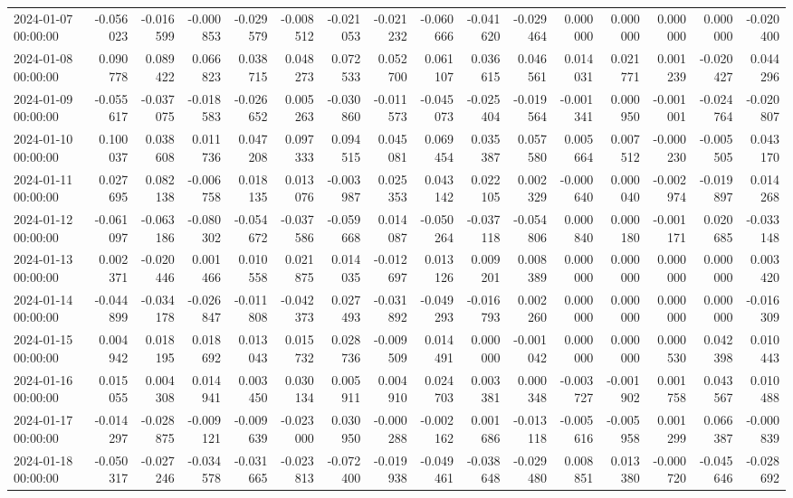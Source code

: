 \begin{tabular}{lrrrrrrrrrrrrrrr}
2024-01-07 00:00:00 & -0.056023 & -0.016599 & -0.000853 & -0.029579 & -0.008512 & -0.021053 & -0.021232 & -0.060666 & -0.041620 & -0.029464 & 0.000000 & 0.000000 & 0.000000 & 0.000000 & -0.020400 \\
2024-01-08 00:00:00 & 0.090778 & 0.089422 & 0.066823 & 0.038715 & 0.048273 & 0.072533 & 0.052700 & 0.061107 & 0.036615 & 0.046561 & 0.014031 & 0.021771 & 0.001239 & -0.020427 & 0.044296 \\
2024-01-09 00:00:00 & -0.055617 & -0.037075 & -0.018583 & -0.026652 & 0.005263 & -0.030860 & -0.011573 & -0.045073 & -0.025404 & -0.019564 & -0.001341 & 0.000950 & -0.001001 & -0.024764 & -0.020807 \\
2024-01-10 00:00:00 & 0.100037 & 0.038608 & 0.011736 & 0.047208 & 0.097333 & 0.094515 & 0.045081 & 0.069454 & 0.035387 & 0.057580 & 0.005664 & 0.007512 & -0.000230 & -0.005505 & 0.043170 \\
2024-01-11 00:00:00 & 0.027695 & 0.082138 & -0.006758 & 0.018135 & 0.013076 & -0.003987 & 0.025353 & 0.043142 & 0.022105 & 0.002329 & -0.000640 & 0.000040 & -0.002974 & -0.019897 & 0.014268 \\
2024-01-12 00:00:00 & -0.061097 & -0.063186 & -0.080302 & -0.054672 & -0.037586 & -0.059668 & 0.014087 & -0.050264 & -0.037118 & -0.054806 & 0.000840 & 0.000180 & -0.001171 & 0.020685 & -0.033148 \\
2024-01-13 00:00:00 & 0.002371 & -0.020446 & 0.001466 & 0.010558 & 0.021875 & 0.014035 & -0.012697 & 0.013126 & 0.009201 & 0.008389 & 0.000000 & 0.000000 & 0.000000 & 0.000000 & 0.003420 \\
2024-01-14 00:00:00 & -0.044899 & -0.034178 & -0.026847 & -0.011808 & -0.042373 & 0.027493 & -0.031892 & -0.049293 & -0.016793 & 0.002260 & 0.000000 & 0.000000 & 0.000000 & 0.000000 & -0.016309 \\
2024-01-15 00:00:00 & 0.004942 & 0.018195 & 0.018692 & 0.013043 & 0.015732 & 0.028736 & -0.009509 & 0.014491 & 0.000000 & -0.001042 & 0.000000 & 0.000000 & 0.000530 & 0.042398 & 0.010443 \\
2024-01-16 00:00:00 & 0.015055 & 0.004308 & 0.014941 & 0.003450 & 0.030134 & 0.005911 & 0.004910 & 0.024703 & 0.003381 & 0.000348 & -0.003727 & -0.001902 & 0.001758 & 0.043567 & 0.010488 \\
2024-01-17 00:00:00 & -0.014297 & -0.028875 & -0.009121 & -0.009639 & -0.023000 & 0.030950 & -0.000288 & -0.002162 & 0.001686 & -0.013118 & -0.005616 & -0.005958 & 0.001299 & 0.066387 & -0.000839 \\
2024-01-18 00:00:00 & -0.050317 & -0.027246 & -0.034578 & -0.031665 & -0.023813 & -0.072400 & -0.019938 & -0.049461 & -0.038648 & -0.029480 & 0.008851 & 0.013380 & -0.000720 & -0.045646 & -0.028692 \\

\end{tabular}
